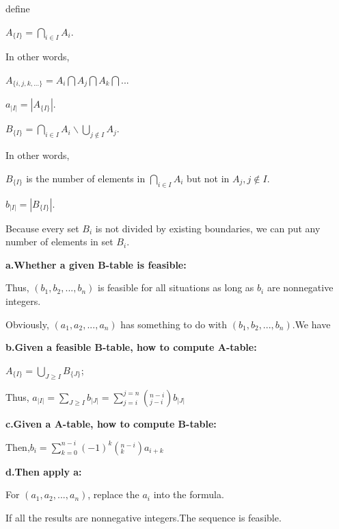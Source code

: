 \documentclass[12pt,a4]{article}
\theoremstyle{exercise}
\begin{document}
     define 
     \begin{center}
      $A_{\{I\}}=\bigcap \limits_{i \in I} A_i $. 
     \end{center} 
     In other words, 
     \begin{center}
      $A_{\{i,j,k,...\}}= A_i \bigcap A_j \bigcap A_k \bigcap ...$
      
      $a_{|I|}=|A_{\{I\}}|.$
     
      $B_{\{I\}}=\bigcap \limits_{i \in I} A_i \backslash \bigcup \limits_{j\notin I }{A_j}$.
     \end{center}
     
     In other words,
     \begin{center}
      $B_{\{I\}}$ is the number of elements in $\bigcap \limits_{i \in I} A_i$ but not in $A_j,j\notin I$.
     
      $b_{|I|}=|B_{\{I\}}|.$
     \end{center}
     
     Because every set $B_i$ is not divided by existing boundaries, we can put any number of elements in set $B_i$.
     
     \textbf{a.Whether a given B-table is feasible:}

     Thus, $(b_1,b_2,...,b_n)$ is feasible for all situations as long as $b_i$ are nonnegative integers.

     Obviously, $(a_1,a_2,...,a_n)$ has something to do with $(b_1,b_2,...,b_n)$.We have
     \begin{center}
     \textbf{b.Given a feasible B-table, how to compute A-table:}

     $A_{\{I\}}=\bigcup \limits_{J\ge I}B_{\{J\}}$;

     Thus, $a_{|I|}=\sum \limits_{J\ge I}b_{|J|}=\sum \limits_{j=i}^{j=n} (_{j-i}^{n-i}) b_{|J|}$
     
     \textbf{c.Given a A-table, how to compute B-table:}

     Then,$b_i=\sum \limits_{k=0}^{n-i} (-1)^k (_{k}^{n-i} )a_{i+k}$
     
     \end{center}

     \textbf{d.Then apply a:}
     
     For $(a_1,a_2,...,a_n)$, replace the $a_i$ into the formula.
     
     If all the results are nonnegative integers.The sequence is feasible.
     
\end{document}
